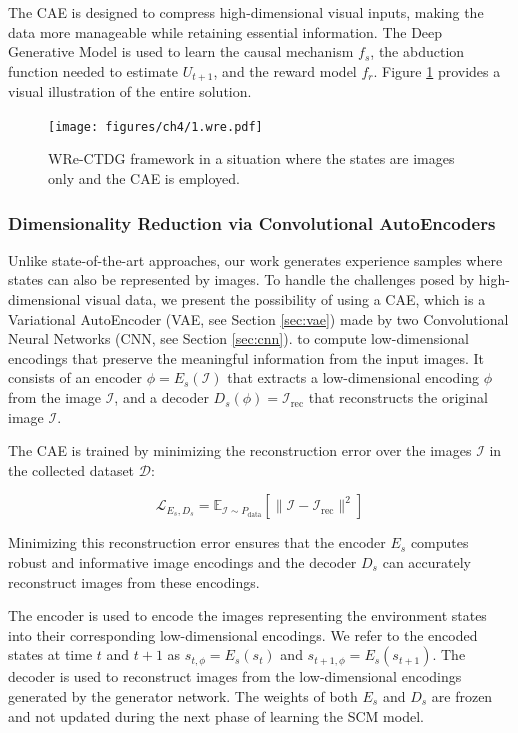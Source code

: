 The CAE is designed to compress high-dimensional visual inputs,
making the data more manageable while retaining essential information.
The Deep Generative Model is used to learn the causal mechanism \( f_s \),
the abduction function needed to estimate \( U_{t+1} \),
and the reward model \( f_r \).
Figure \ref{fig:wre} provides a visual illustration of the entire solution.

\begin{figure}[ht]
    \centering
    \texttt{[image: figures/ch4/1.wre.pdf]}
    \caption{WRe-CTDG framework in a situation where the states are
    images only and the CAE is employed.}
    \label{fig:wre}
\end{figure}

\subsubsection{Dimensionality Reduction via Convolutional AutoEncoders}

Unlike state-of-the-art approaches, our work generates experience samples
where states can also be represented by images. To handle the challenges posed
by high-dimensional visual data, we present the possibility of using a CAE,
which is a Variational AutoEncoder (VAE, see Section \ref{sec:vae})
made by two Convolutional Neural Networks (CNN, see Section \ref{sec:cnn}).
to compute low-dimensional encodings that preserve the meaningful
information from the input images.
It consists of an encoder \( \phi = E_s(\mathcal{I}) \)
that extracts a low-dimensional encoding \( \phi \)
from the image \( \mathcal{I} \), and a decoder
\( D_s(\phi) = \mathcal{I}_{\text{rec}} \)
that reconstructs the original image \( \mathcal{I} \).

The CAE is trained by minimizing the reconstruction error over
the images \( \mathcal{I} \) in the collected dataset \( \mathcal{D} \):

\begin{equation}
\mathcal{L}_{E_s, D_s} = \mathbb{E}_{\mathcal{I} \sim P_{\text{data}}}
\left[ \| \mathcal{I} - \mathcal{I}_{\text{rec}} \|^2 \right]
\end{equation}

Minimizing this reconstruction error ensures that the encoder \( E_s \)
computes robust and informative image encodings and the decoder \( D_s \)
can accurately reconstruct images from these encodings.

The encoder is used to encode the images representing the environment
states into their corresponding low-dimensional encodings.
We refer to the encoded states at time \( t \) and \( t+1 \) as
\( s_{t,\phi} = E_s(s_t) \) and \( s_{t+1,\phi} = E_s(s_{t+1}) \).
The decoder is used to reconstruct images from the low-dimensional
encodings generated by the generator network. The weights of both
\( E_s \) and \( D_s \) are frozen and not updated during the next
phase of learning the SCM model.

